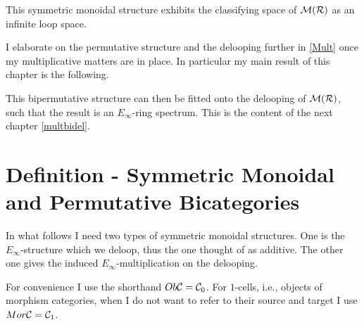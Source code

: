 This symmetric monoidal structure exhibits the classifying space of
$\mathcal{M}(\mathcal{R})$ as an infinite loop space.

{}

I elaborate on the permutative structure and the delooping further in \ref{Mult} 
once my multiplicative matters are in place. In 
particular my main result of this chapter is the following.
{}

This bipermutative structure can then be fitted onto the delooping of
$\mathcal{M}(\mathcal{R})$, such that the result is an $E_\infty$-ring spectrum. This is
the content of the next chapter \ref{multbidel}.

{}

{}

\section{Definition - Symmetric Monoidal and Permutative Bicategories}
In what follows I need two types of symmetric monoidal structures.
One is the $E_\infty$-structure which we deloop, thus the one thought
of as additive. The other one gives the induced $E_\infty$-multiplication
on the delooping.

For convenience I use the shorthand $Ob\mathcal{C}=\mathcal{C}_0$. For $1$-cells, 
i.e., objects of morphism categories, when I do not want to refer 
to their source and target I use $Mor\mathcal{C}=\mathcal{C}_1$.

